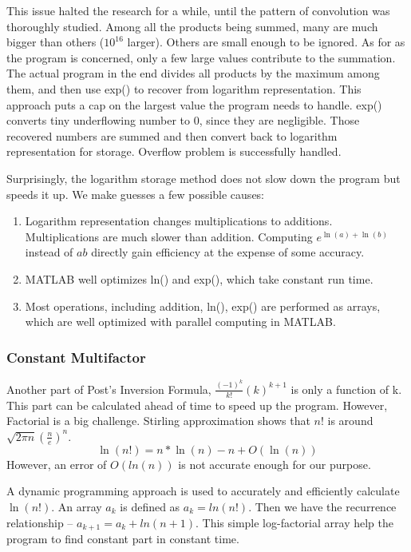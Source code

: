 \documentclass[12pt]{article}
\begin{document}
This issue halted the research for a while, until the pattern of convolution was thoroughly studied. Among all the products being summed, many are much bigger than others ($10^{16}$ larger). Others are small enough to be ignored.
As for as the program is concerned, only a few large values contribute to the summation. 
The actual program in the end divides all products by the maximum among them, and then use exp() to recover from logarithm representation. This approach puts a cap on the largest value the program needs to handle. exp() converts tiny underflowing number to 0, since they are negligible. Those recovered numbers are summed and then convert back to logarithm representation for storage. Overflow problem is successfully handled.

Surprisingly, the logarithm storage method does not slow down the program but speeds it up. We make guesses a few possible causes:
\begin{enumerate}
\item Logarithm representation changes multiplications to additions. Multiplications are much slower than addition. Computing $e^{\ln(a)+\ln(b)}$ instead of $a b$ directly gain efficiency at the expense of some accuracy.
\item MATLAB well optimizes ln() and exp(), which take constant run time.
\item Most operations, including addition, ln(), exp() are performed as arrays, which are well optimized with parallel computing in MATLAB.
\end{enumerate}

\subsubsection{Constant Multifactor}

Another part of Post's Inversion Formula, $\frac{(-1)^{k}}{k!} (k)^{k+1}$ is only a function of k. This part can be calculated ahead of time to speed up the program. However, Factorial is a big challenge. Stirling approximation shows that $n!$ is around $\sqrt{2\pi n }(\frac{n}{e})^{n}$.
$$\ln(n!) = n*\ln(n) - n + O(\ln(n)) $$
However, an error of $O(ln(n))$ is not accurate enough for our purpose. 

A dynamic programming approach is used to accurately and efficiently calculate $\ln(n!)$. An array $a_{k}$ is defined as $a_{k} = ln(n!)$. Then we have the recurrence relationship -- $a_{k+1} = a_{k} + ln(n+1)$. This simple log-factorial array help the program to find constant part in constant time.
\end{document}
